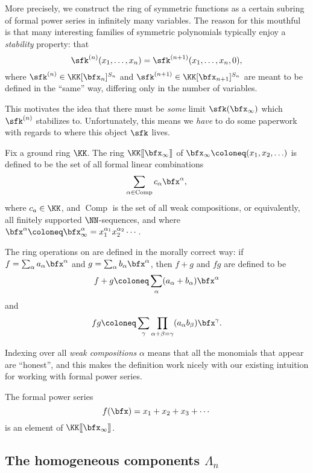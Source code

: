 \documentclass{article}
\newcommand{\fps}[2]{#1 [\kern-1.2pt[ {#2} ]\kern-1.2pt]}
\newcommand{\pring}[2]{#1 [ {#2} ]}
\DeclareMathOperator{\Com}{Comp}
\begin{document}
More precisely, we construct the ring of symmetric functions as a certain subring of formal power series in infinitely many variables.
The reason for this mouthful is that many interesting families of symmetric polynomials typically enjoy a \textit{stability} property: that
\[
    \sfk^{(n)}(x_1,\ldots,x_n)
    =
    \sfk^{(n+1)}(x_1,\ldots,x_n, 0),
\]
where $\sfk^{(n)} \in \pring{\KK}{\bfx_n}^{S_n}$ and $\sfk^{(n+1)} \in \pring{\KK}{\bfx_{n+1}}^{S_n}$ are meant to be defined in the ``same'' way, differing only in the number of variables.

This motivates the idea that there must be \textit{some} limit $\sfk(\bfx_\infty)$ which $\sfk^{(n)}$ stabilizes to.
Unfortunately, this means we \textit{have} to do some paperwork with regards to where this object $\sfk$ lives.

\begin{definition}
    Fix a ground ring $\KK$.
    The ring $\fps{\KK}{\bfx_\infty}$ of  $\bfx_\infty \coloneq (x_1, x_2, \ldots)$ is defined to be the set of all formal linear combinations 
    \[
        \sum_{\alpha\in\Com} c_\alpha \bfx^\alpha,
    \]
    where $c_a \in \KK$, and $\Com$ is the set of all weak compositions, or equivalently, all finitely supported $\NN$-sequences, and where $\bfx^\alpha \coloneq \bfx_\infty^\alpha = x_1^{\alpha_1}x_2^{\alpha_2}\cdots$.

    The ring operations on are defined in the morally correct way:
    if $f = \sum_\alpha a_\alpha \bfx^\alpha$ and $g = \sum_\alpha b_\alpha \bfx^\alpha$, then $f + g$ and $fg$ are defined to be
    \[
        f+g
        \coloneq
        \sum_\alpha
        (a_\alpha+b_\alpha)\bfx^\alpha
    \]
    and
    \[
        fg
        \coloneq
        \sum_\gamma \prod_{\alpha+\beta=\gamma}
        (a_\alpha b_\beta) \bfx^\gamma.
    \]
\end{definition}

Indexing over all \textit{weak compositions} $\alpha$ means that all the monomials that appear are ``honest'', and this makes the definition work nicely with our existing intuition for working with formal power series.

\begin{example}
    The formal power series
    \[
        f(\bfx)
        =
        x_1 + x_2 + x_3 + \cdots
    \]
    is an element of $\fps{\KK}{\bfx_\infty}$.
\end{example}

\subsection{The homogeneous components $\Lambda_n$}
\end{document}
